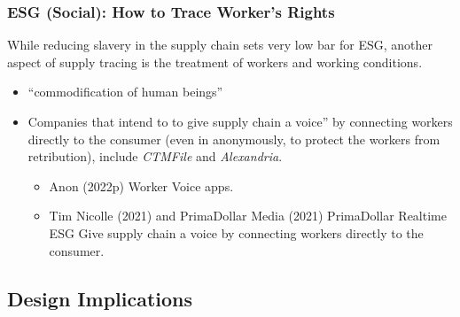 \documentclass[
  letterpaper,
  DIV=11,
  numbers=noendperiod]{scrartcl}
\providecommand{\tightlist}{%
  \setlength{\itemsep}{0pt}\setlength{\parskip}{0pt}}\usepackage{longtable,booktabs,array}
\begin{document}
\subsubsection{ESG (Social): How to Trace Worker's
Rights}\label{esg-social-how-to-trace-workers-rights}

While reducing slavery in the supply chain sets very low bar for ESG,
another aspect of supply tracing is the treatment of workers and working
conditions.

\begin{itemize}
\item
  ``commodification of human beings''
\item
  Companies that intend to to give supply chain a voice'' by connecting
  workers directly to the consumer (even in anonymously, to protect the
  workers from retribution), include \emph{CTMFile} and
  \emph{Alexandria}.

  \begin{itemize}
  \tightlist
  \item
    Anon (2022p) Worker Voice apps.
  \item
    Tim Nicolle (2021) and PrimaDollar Media (2021) PrimaDollar Realtime
    ESG Give supply chain a voice by connecting workers directly to the
    consumer.
  \end{itemize}
\end{itemize}

\subsection{Design Implications}\label{design-implications-4}
\end{document}
